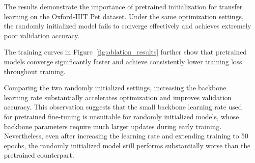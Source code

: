 The results demonstrate the importance of pretrained initialization for transfer learning on the Oxford-IIIT Pet dataset. Under the same optimization settings, the randomly initialized model fails to converge effectively and achieves extremely poor validation accuracy.

The training curves in Figure~\ref{fig:ablation_results} further show that pretrained models converge significantly faster and achieve consistently lower training loss throughout training.

Comparing the two randomly initialized settings, increasing the backbone learning rate substantially accelerates optimization and improves validation accuracy. This observation suggests that the small backbone learning rate used for pretrained fine-tuning is unsuitable for randomly initialized models, whose backbone parameters require much larger updates during early training. Nevertheless, even after increasing the learning rate and extending training to 50 epochs, the randomly initialized model still performs substantially worse than the pretrained counterpart.
